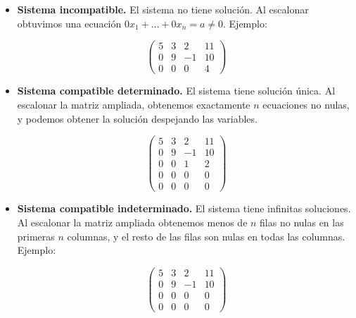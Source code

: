\begin{itemize}
\item   \textbf{Sistema incompatible.} El sistema no tiene solución. Al
    escalonar obtuvimos una ecuación $0 x_1 + \dots + 0x_n = a \neq 0$.
    Ejemplo:

$$
\left(\begin{array}{rrr|r}5&3&2&11\\0&9&-1 & 10\\0&0&0&4\end{array}\right)
$$

\item   \textbf{Sistema compatible determinado.} El sistema tiene solución única.
    Al escalonar la matriz ampliada, obtenemos exactamente $n$
    ecuaciones no nulas, y podemos obtener la solución despejando las
    variables.\

$$
\left(\begin{array}{rrr|r}5&3&2&11\\0&9&-1 & 10\\0&0&1&2\\0&0&0 & 0\\0&0&0&0\end{array}\right)
$$

\item  \textbf{Sistema compatible indeterminado.} El sistema tiene infinitas
    soluciones. Al escalonar la matriz ampliada obtenemos menos de $n$
    filas no nulas en las primeras $n$ columnas, y el resto de las filas
    son nulas en todas las columnas. Ejemplo:

$$
\left(\begin{array}{rrr|r}5&3&2&11\\0&9&-1 & 10\\0&0&0 & 0\\0&0&0&0\end{array}\right)
$$

\end{itemize}

